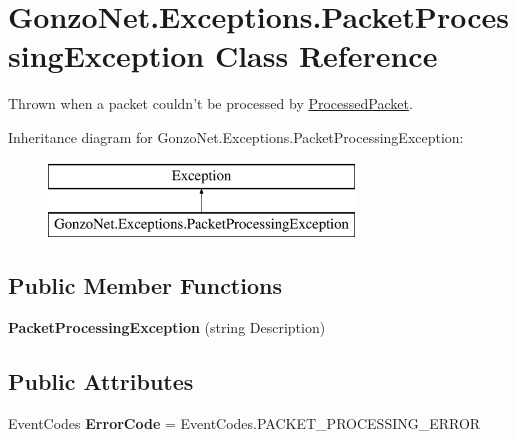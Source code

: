 \hypertarget{class_gonzo_net_1_1_exceptions_1_1_packet_processing_exception}{\section{Gonzo\+Net.\+Exceptions.\+Packet\+Processing\+Exception Class Reference}
\label{class_gonzo_net_1_1_exceptions_1_1_packet_processing_exception}
}


Thrown when a packet couldn't be processed by \hyperlink{class_gonzo_net_1_1_processed_packet}{Processed\+Packet}.  


Inheritance diagram for Gonzo\+Net.\+Exceptions.\+Packet\+Processing\+Exception\+:\begin{figure}[H]
\begin{center}
\leavevmode
\includegraphics[height=2.000000cm]{class_gonzo_net_1_1_exceptions_1_1_packet_processing_exception}
\end{center}
\end{figure}
\subsection*{Public Member Functions}
\begin{DoxyCompactItemize}
\item 
\hypertarget{class_gonzo_net_1_1_exceptions_1_1_packet_processing_exception_ac961edd4060730139454fb2c918d7275}{{\bfseries Packet\+Processing\+Exception} (string Description)}\label{class_gonzo_net_1_1_exceptions_1_1_packet_processing_exception_ac961edd4060730139454fb2c918d7275}

\end{DoxyCompactItemize}
\subsection*{Public Attributes}
\begin{DoxyCompactItemize}
\item 
\hypertarget{class_gonzo_net_1_1_exceptions_1_1_packet_processing_exception_ad60160291e6de2a78d65b66c255cf863}{Event\+Codes {\bfseries Error\+Code} = Event\+Codes.\+P\+A\+C\+K\+E\+T\+\_\+\+P\+R\+O\+C\+E\+S\+S\+I\+N\+G\+\_\+\+E\+R\+R\+O\+R}\label{class_gonzo_net_1_1_exceptions_1_1_packet_processing_exception_ad60160291e6de2a78d65b66c255cf863}

\end{DoxyCompactItemize}


